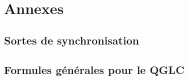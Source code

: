 \documentclass[fleqn,10pt,c]{beamer}
\begin{document}
\section{Annexes}
\subsection{Sortes de synchronisation}

\subsection{Formules générales pour le QGLC}


\begin{comment}
plan pour la presentation de ma thèse

-introduction

-integration des données

-analyse statitique des propriétés quantitatives
  
  *probability in CTMC
  *

-analyse statique des bifurcations

-implementation

-biological applications



\end{comment}
\end{document}
